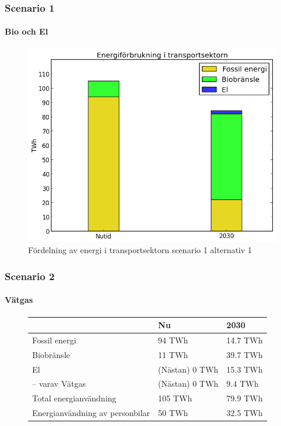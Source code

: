 \documentclass{beamer}
\begin{document}
\begin{frame}
	\frametitle{Scenario 1}
	\framesubtitle{Bio och El}
	\begin{figure}[h!]
       \centering
       \includegraphics[scale=0.5]{scen1a1transport.png}
       \caption{Fördelning av energi i transportsektorn scenario 1 alternativ 1}
	\end{figure}
\end{frame}

\begin{frame}
	\frametitle{Scenario 2}
	\framesubtitle{Vätgas}
		\begin{figure}[h!]
			\centering
			\label{tab:scen2energi}
			\begin{tabular}{ | l | l | l | }
			\hline
								& Nu		& 2030 \\ \hline
			Fossil energi				& 94 TWh	& 14.7 TWh \\ \hline
			Biobränsle				& 11 TWh	& 39.7 TWh \\ \hline %
			El					& (Nästan) 0 TWh &  15.3 TWh \\ \hline %
			-- varav Vätgas     & (Nästan) 0 TWh & 9.4 TWh\\ \hline
			Total energianvändning		& 105 TWh	& 79.9 TWh \\ \hline
			Energianvändning av personbilar	& 50 TWh	& 32.5 TWh \\ \hline
			\end{tabular}
		\end{figure}
\end{frame}
\end{document}
